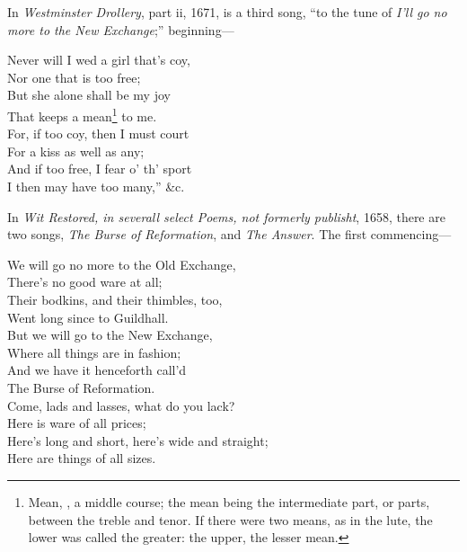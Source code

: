 
In \textit{Westminster Drollery}, part ii, 1671, is a third song, “to the tune of \textit{I'll go
no more to the New Exchange};” beginning—


\begin{dcverse}\begin{altverse}
Never will I wed a girl that's coy,\\
Nor one that is too free;\\
But she alone shall be my joy\\
That keeps a mean\footnote{\textit{}
Mean, \ie, a middle course; the mean being the intermediate
part, or parts, between the treble and tenor. If
there were two means, as in the lute, the lower was called
the greater: the upper, the lesser mean.}
 to me.\\
For, if too coy, then I must court\\
For a kiss as well as any;\\
And if too free, I fear o’ th’ sport\\
I then may have too many,” \&c.
\end{altverse}
\end{dcverse}


In \textit{Wit Restored, in severall select Poems, not formerly publisht}, 1658, there are
two songs, \textit{The Burse of Reformation}, and \textit{The Answer}. The first commencing—


\begin{dcverse}\begin{altverse}
We will go no more to the Old Exchange,\\
There’s no good ware at all;\\
Their bodkins, and their thimbles, too,\\
Went long since to Guildhall.\\
But we will go to the New Exchange,\\
Where all things are in fashion;\\
And we have it henceforth call’d\\
The Burse of Reformation.\\
Come, lads and lasses, what do you lack?\\
Here is ware of all prices;\\
Here’s long and short, here’s wide and straight;\\
Here are things of all sizes.
\end{altverse}
\end{dcverse}

